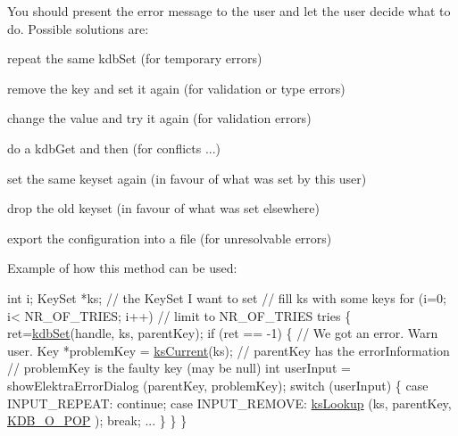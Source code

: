 You should present the error message to the user and let the user decide what to do. Possible solutions are\-:
\begin{DoxyItemize}
\item repeat the same kdb\-Set (for temporary errors)
\item remove the key and set it again (for validation or type errors)
\item change the value and try it again (for validation errors)
\item do a kdb\-Get and then (for conflicts ...)
\begin{DoxyItemize}
\item set the same keyset again (in favour of what was set by this user)
\item drop the old keyset (in favour of what was set elsewhere)
\end{DoxyItemize}
\item export the configuration into a file (for unresolvable errors)
\end{DoxyItemize}

\begin{DoxyParagraph}{Example of how this method can be used\-:}

\begin{DoxyCode}
\textcolor{keywordtype}{int} i;
KeySet *ks;  \textcolor{comment}{// the KeySet I want to set}
\textcolor{comment}{// fill ks with some keys}
\textcolor{keywordflow}{for} (i=0; i< NR\_OF\_TRIES; i++) \textcolor{comment}{// limit to NR\_OF\_TRIES tries}
\{
        ret=\hyperlink{group__kdb_ga11436b058408f83d303ca5e996832bcf}{kdbSet}(handle, ks, parentKey);
        \textcolor{keywordflow}{if} (ret == -1)
        \{
                \textcolor{comment}{// We got an error. Warn user.}
                Key *problemKey = \hyperlink{group__keyset_ga4287b9416912c5f2ab9c195cb74fb094}{ksCurrent}(ks);
                \textcolor{comment}{// parentKey has the errorInformation}
                \textcolor{comment}{// problemKey is the faulty key (may be null)}
                \textcolor{keywordtype}{int} userInput = showElektraErrorDialog (parentKey, problemKey);
                \textcolor{keywordflow}{switch} (userInput)
                \{
                \textcolor{keywordflow}{case} INPUT\_REPEAT: \textcolor{keywordflow}{continue};
                \textcolor{keywordflow}{case} INPUT\_REMOVE: \hyperlink{group__keyset_gaa34fc43a081e6b01e4120daa6c112004}{ksLookup} (ks, parentKey, \hyperlink{group__kdb_gga98a3d6a4016c9dad9cbd1a99a9c2a45aa52fb5f2cc86773d393da62bebebf7984}{KDB\_O\_POP}
      ); \textcolor{keywordflow}{break};
                ...
                \}
        \}
\}
\end{DoxyCode}

\end{DoxyParagraph}

